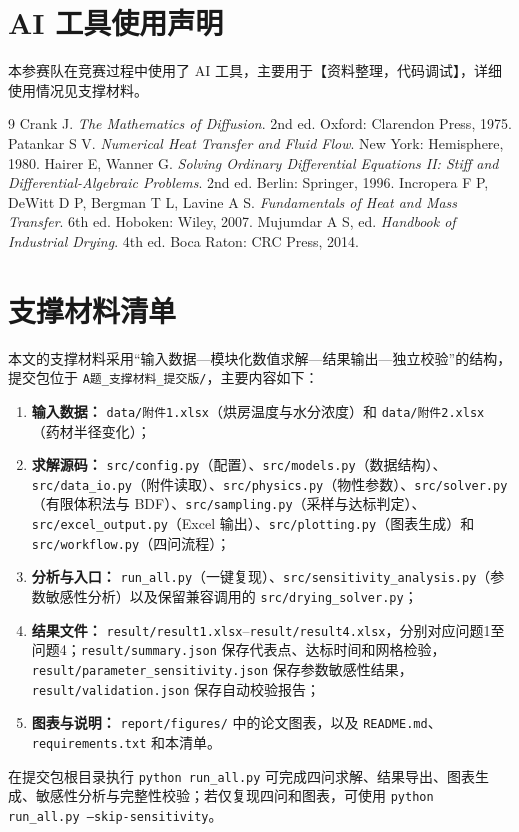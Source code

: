 \documentclass[12pt,a4paper,fontset=none]{ctexart}
\begin{document}
\section*{AI 工具使用声明}
本参赛队在竞赛过程中使用了 AI 工具，主要用于【资料整理，代码调试】，详细使用情况见支撑材料。

\begin{thebibliography}{9}
 Crank J. \textit{The Mathematics of Diffusion}. 2nd ed. Oxford: Clarendon Press, 1975.
 Patankar S V. \textit{Numerical Heat Transfer and Fluid Flow}. New York: Hemisphere, 1980.
 Hairer E, Wanner G. \textit{Solving Ordinary Differential Equations II: Stiff and Differential-Algebraic Problems}. 2nd ed. Berlin: Springer, 1996.
 Incropera F P, DeWitt D P, Bergman T L, Lavine A S. \textit{Fundamentals of Heat and Mass Transfer}. 6th ed. Hoboken: Wiley, 2007.
 Mujumdar A S, ed. \textit{Handbook of Industrial Drying}. 4th ed. Boca Raton: CRC Press, 2014.
\end{thebibliography}

\section*{支撑材料清单}
本文的支撑材料采用“输入数据—模块化数值求解—结果输出—独立校验”的结构，提交包位于 \texttt{A题\_支撑材料\_提交版/}，主要内容如下：
\begingroup\small\raggedright
\begin{enumerate}[label=(\arabic*)]
  \item \textbf{输入数据：} \texttt{data/附件1.xlsx}（烘房温度与水分浓度）和 \texttt{data/附件2.xlsx}（药材半径变化）；
  \item \textbf{求解源码：} \texttt{src/config.py}（配置）、\texttt{src/models.py}（数据结构）、\texttt{src/data\_io.py}（附件读取）、\texttt{src/physics.py}（物性参数）、\texttt{src/solver.py}（有限体积法与 BDF）、\texttt{src/sampling.py}（采样与达标判定）、\texttt{src/excel\_output.py}（Excel 输出）、\texttt{src/plotting.py}（图表生成）和 \texttt{src/workflow.py}（四问流程）；
  \item \textbf{分析与入口：} \texttt{run\_all.py}（一键复现）、\texttt{src/sensitivity\_analysis.py}（参数敏感性分析）以及保留兼容调用的 \texttt{src/drying\_solver.py}；
  \item \textbf{结果文件：} \texttt{result/result1.xlsx}--\texttt{result/result4.xlsx}，分别对应问题1至问题4；\texttt{result/summary.json} 保存代表点、达标时间和网格检验，\texttt{result/parameter\_sensitivity.json} 保存参数敏感性结果，\texttt{result/validation.json} 保存自动校验报告；
  \item \textbf{图表与说明：} \texttt{report/figures/} 中的论文图表，以及 \texttt{README.md}、\texttt{requirements.txt} 和本清单。
\end{enumerate}
在提交包根目录执行 \texttt{python run\_all.py} 可完成四问求解、结果导出、图表生成、敏感性分析与完整性校验；若仅复现四问和图表，可使用 \texttt{python run\_all.py --skip-sensitivity}。
\endgroup
\end{document}
